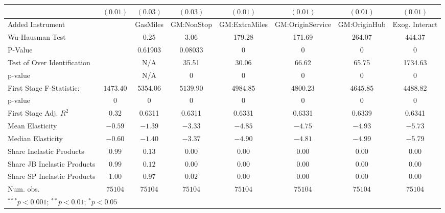 \begin{tabular}{l c c c c c c c}
                             & $(0.01)$      & $(0.03)$      & $(0.03)$      & $(0.01)$      & $(0.01)$         & $(0.01)$      & $(0.01)$       \\
\midrule
Added Instrument             &               & GasMiles      & GM:NonStop    & GM:ExtraMiles & GM:OriginService & GM:OriginHub  & Exog. Interact \\
Wu-Hausman Test              &               & 0.25          & 3.06          & 179.28        & 171.69           & 264.07        & 444.37         \\
P-Value                      &               & 0.61903       & 0.08033       & 0             & 0                & 0             & 0              \\
Test of Over Identification  &               & N/A           & 35.51         & 30.06         & 66.62            & 65.75         & 1734.63        \\
p-value                      &               & N/A           & 0             & 0             & 0                & 0             & 0              \\
First Stage F-Statistic:     & $1473.40$     & $5354.06$     & $5139.90$     & $4984.85$     & $4800.23$        & $4645.85$     & $4488.82$      \\
p-value                      & $0$           & $0$           & $0$           & $0$           & $0$              & $0$           & $0$            \\
First Stage Adj. $R^2$       & 0.32          & 0.6311        & 0.6311        & 0.6331        & 0.6331           & 0.6339        & 0.6341         \\
Mean Elasticity              & $-0.59$       & $-1.39$       & $-3.33$       & $-4.85$       & $-4.75$          & $-4.93$       & $-5.73$        \\
Median Elasticity            & $-0.60$       & $-1.40$       & $-3.37$       & $-4.90$       & $-4.81$          & $-4.99$       & $-5.79$        \\
Share Inelastic Products     & $0.99$        & $0.13$        & $0.00$        & $0.00$        & $0.00$           & $0.00$        & $0.00$         \\
Share JB Inelastic Products  & $0.99$        & $0.12$        & $0.00$        & $0.00$        & $0.00$           & $0.00$        & $0.00$         \\
Share SP Inelastic Products  & $1.00$        & $0.97$        & $0.02$        & $0.00$        & $0.00$           & $0.00$        & $0.00$         \\
Num. obs.                    & $75104$       & $75104$       & $75104$       & $75104$       & $75104$          & $75104$       & $75104$        \\
\bottomrule
\multicolumn{8}{l}{\scriptsize{$^{***}p<0.001$; $^{**}p<0.01$; $^{*}p<0.05$}}
\end{tabular}
